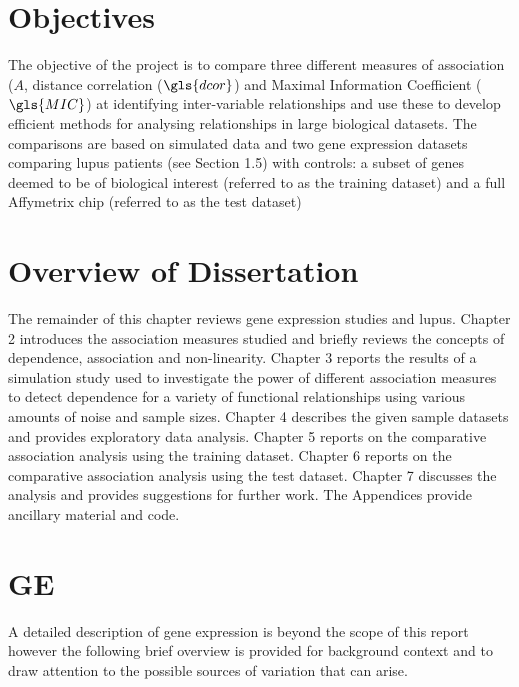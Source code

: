 \documentclass[a4paper, 12pt]{report}
\begin{document}
\section{Objectives}
The objective of the project is to compare three different measures of association ($A$, distance correlation ($\gls{dcor}$) and Maximal Information Coefficient ($\gls{MIC}$) at identifying inter-variable relationships and use these to develop efficient methods for analysing relationships in large biological datasets. The comparisons are based on simulated data and two gene expression datasets comparing lupus patients (see Section 1.5) with controls: a subset of genes deemed to be of biological interest (referred to as the training dataset) and a full Affymetrix chip (referred to as the test dataset)

\section{Overview of Dissertation}
The remainder of this chapter reviews gene expression studies and lupus. Chapter 2 introduces the association measures studied and briefly reviews the concepts of dependence, association and non-linearity. Chapter 3 reports the results of a simulation study used to investigate the power of different association measures to detect dependence for a variety of functional relationships using various amounts of noise and sample sizes. Chapter 4 describes the given sample datasets and provides exploratory data analysis. Chapter 5 reports on the comparative association analysis using the training dataset. Chapter 6 reports on the comparative association analysis using the test dataset. Chapter 7 discusses the analysis and provides suggestions for further work. The Appendices provide ancillary material and code.

\section{\gls{GE}}
A detailed description of gene expression is beyond the scope of this report however the following brief overview is provided for background context and to draw attention to the possible sources of variation that can arise.
\end{document}
